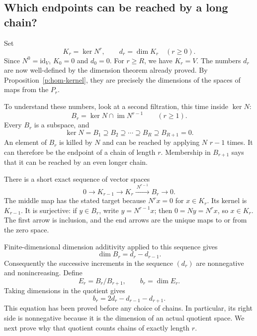 \documentclass[11pt]{article}
\theoremstyle{definition}
\theoremstyle{remark}\newtheorem{remark}[theorem]{Remark}
\newcommand{\id}{\mathrm{id}}
\DeclareMathOperator{\Ker}{ker}
\DeclareMathOperator{\im}{im}
\begin{document}
\subsection{Which endpoints can be reached by a long chain?}
\label{p:bottom-spaces}

Set
\[
 K_r=\Ker N^r,\qquad d_r=\dim K_r\quad(r\geq0).
\]
Since $N^0=\id_V$, $K_0=0$ and $d_0=0$. For $r\geq R$, we have
$K_r=V$. The numbers $d_r$ are now well-defined by the dimension theorem
already proved. By Proposition~\ref{p:hom-kernel}, they are precisely the
dimensions of the spaces of maps from the $P_r$.

To understand these numbers, look at a second filtration, this time inside
$\Ker N$:
\[
 B_r=\Ker N\cap\im N^{r-1}\qquad(r\geq1).
\]
Every $B_r$ is a subspace, and
\[
 \Ker N=B_1\supseteq B_2\supseteq\cdots
 \supseteq B_R\supseteq B_{R+1}=0.
\]
An element of $B_r$ is killed by $N$ and can be reached by applying $N$
$r-1$ times. It can therefore be the endpoint of a chain of length $r$.
Membership in $B_{r+1}$ says that it can be reached by an even longer chain.

There is a short exact sequence of vector spaces
\begin{equation}
\label{p:kernel-bottom-ses}
 0\longrightarrow K_{r-1}\longrightarrow K_r
 \xrightarrow{\ N^{r-1}\ } B_r\longrightarrow0.
\end{equation}
The middle map has the stated target because $N^rx=0$ for $x\in K_r$.
Its kernel is $K_{r-1}$. It is surjective: if $y\in B_r$, write
$y=N^{r-1}x$; then $0=Ny=N^rx$, so $x\in K_r$. The first arrow is
inclusion, and the end arrows are the unique maps to or from the zero space.

Finite-dimensional dimension additivity applied to this sequence gives
\begin{equation}
\label{p:bottom-dim}
 \dim B_r=d_r-d_{r-1}.
\end{equation}
Consequently the successive increments in the sequence $(d_r)$ are
nonnegative and nonincreasing. Define
\begin{equation}
\label{p:canonical-multiplicity}
 E_r=B_r/B_{r+1},\qquad b_r=\dim E_r.
\end{equation}
Taking dimensions in the quotient gives
\begin{equation}
\label{p:second-difference}
 \boxed{\ b_r=2d_r-d_{r-1}-d_{r+1}.\ }
\end{equation}
This equation has been proved before any choice of chains. In particular,
its right side is nonnegative because it is the dimension of an actual
quotient space. We next prove why that quotient counts chains of exactly
length $r$.
\end{document}
